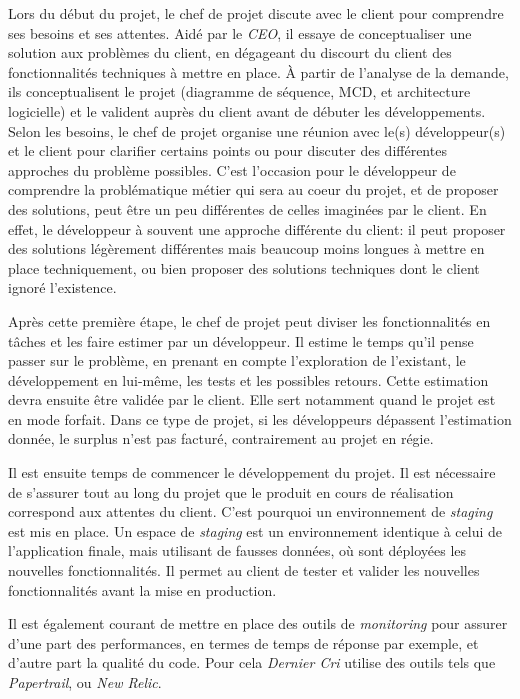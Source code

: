 \bigskip

Lors du début du projet, le chef de projet discute avec le client pour
comprendre ses besoins et ses attentes. Aidé par le \emph{CEO}, il
essaye de conceptualiser une solution aux problèmes du client, en
dégageant du discourt du client des fonctionnalités techniques à mettre
en place. À partir de l'analyse de la demande, ils conceptualisent le
projet (diagramme de séquence, MCD, et architecture logicielle) et le
valident auprès du client avant de débuter les développements. Selon les
besoins, le chef de projet organise une réunion avec le(s)
développeur(s) et le client pour clarifier certains points ou pour
discuter des différentes approches du problème possibles. C'est
l'occasion pour le développeur de comprendre la problématique métier qui
sera au coeur du projet, et de proposer des solutions, peut être un peu
différentes de celles imaginées par le client. En effet, le développeur
à souvent une approche différente du client: il peut proposer des
solutions légèrement différentes mais beaucoup moins longues à mettre en
place techniquement, ou bien proposer des solutions techniques dont le
client ignoré l'existence.

\bigskip

Après cette première étape, le chef de projet peut diviser les
fonctionnalités en tâches et les faire estimer par un développeur. Il
estime le temps qu'il pense passer sur le problème, en prenant en compte
l'exploration de l'existant, le développement en lui-même, les tests et
les possibles retours. Cette estimation devra ensuite être validée par
le client. Elle sert notamment quand le projet est en mode forfait. Dans
ce type de projet, si les développeurs dépassent l'estimation donnée, le
surplus n'est pas facturé, contrairement au projet en régie.

\bigskip

Il est ensuite temps de commencer le développement du projet. Il est
nécessaire de s'assurer tout au long du projet que le produit en cours
de réalisation correspond aux attentes du client. C'est pourquoi un
environnement de \emph{staging} est mis en place. Un espace de
\emph{staging} est un environnement identique à celui de l'application
finale, mais utilisant de fausses données, où sont déployées les
nouvelles fonctionnalités. Il permet au client de tester et valider les
nouvelles fonctionnalités avant la mise en production.

\bigskip

Il est également courant de mettre en place des outils de
\emph{monitoring} pour assurer d'une part des performances, en termes de
temps de réponse par exemple, et d'autre part la qualité du code. Pour
cela \emph{Dernier Cri} utilise des outils tels que \emph{Papertrail},
ou \emph{New Relic}.

